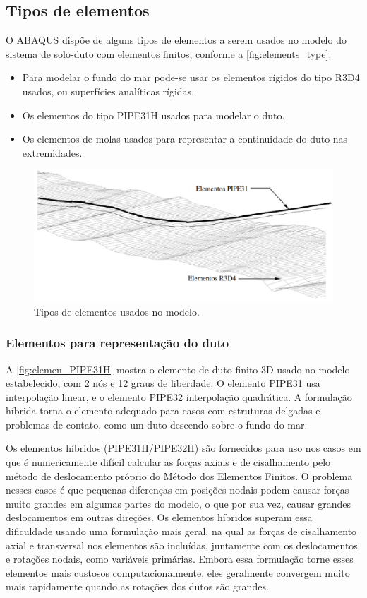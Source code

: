\subsection{Tipos de elementos}

O ABAQUS dispõe de alguns tipos de elementos a serem usados no modelo do sistema de solo-duto com elementos finitos, conforme a \autoref{fig:elements_type}:

\begin{itemize}
    \item Para modelar o fundo do mar pode-se usar os elementos rígidos do tipo R3D4 usados, ou superfícies analíticas rígidas.
    \item Os elementos do tipo PIPE31H usados para modelar o duto.
    \item Os elementos de molas usados para representar a continuidade do duto nas extremidades.
\end{itemize}

\begin{figure}[!ht]
    \centering
    \caption{Tipos de elementos usados no modelo.}\label{fig:elements_type}
    \includegraphics[width=0.8\linewidth]{imagens/elements_types}
\end{figure}

\subsubsection{Elementos para representação do duto}

A \autoref{fig:elemen_PIPE31H} mostra o elemento de duto finito 3D usado no modelo estabelecido, com 2 nós e 12 graus de liberdade.
O elemento PIPE31 usa interpolação linear, e o elemento PIPE32 interpolação quadrática.
A formulação híbrida torna o elemento adequado para casos com estruturas delgadas e problemas de contato, como um duto descendo sobre o fundo do mar.

Os elementos híbridos (PIPE31H/PIPE32H) são fornecidos para uso nos casos em que é numericamente difícil calcular as forças axiais e de cisalhamento pelo método de deslocamento próprio do Método dos Elementos Finitos.
O problema nesses casos é que pequenas diferenças em posições nodais podem causar forças muito grandes em algumas partes do modelo, o que por sua vez, causar grandes deslocamentos em outras direções.
Os elementos híbridos superam essa dificuldade usando uma formulação mais geral, na qual as forças de cisalhamento axial e transversal nos elementos são incluídas, juntamente com os deslocamentos e rotações nodais, como variáveis primárias.
Embora essa formulação torne esses elementos mais custosos computacionalmente, eles geralmente convergem muito mais rapidamente quando as rotações dos dutos são grandes.

